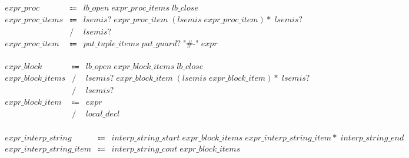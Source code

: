 \begin{align*}
    \begin{array}{rcll}
        \mathit{expr\_proc}
        &\Coloneq &\mathit{lb\_open}\; \mathit{expr\_proc\_items}\; \mathit{lb\_close} \\
        \mathit{expr\_proc\_items}
        &\Coloneq &\mathit{lsemis}{?}\; \mathit{expr\_proc\_item}\; (\mathit{lsemis}\; \mathit{expr\_proc\_item}){*}\; \mathit{lsemis}{?} \\
        &\mathrel{/} &\mathit{lsemis}{?} \\
        \mathit{expr\_proc\_item}
        &\Coloneq &\mathit{pat\_tuple\_items}\; \mathit{pat\_guard}{?}\; \texttt{"\#-"}\; \mathit{expr}
    \end{array}
\end{align*}

\begin{align*}
    \begin{array}{rcll}
        \mathit{expr\_block}
        &\Coloneq &\mathit{lb\_open}\; \mathit{expr\_block\_items}\; \mathit{lb\_close} \\
        \mathit{expr\_block\_items}
        &\mathrel{/} &\mathit{lsemis}{?}\; \mathit{expr\_block\_item}\; (\mathit{lsemis}\; \mathit{expr\_block\_item}){*}\; \mathit{lsemis}{?} \\
        &\mathrel{/} &\mathit{lsemis}{?} \\
        \mathit{expr\_block\_item}
        &\Coloneq &\mathit{expr} \\
        &\mathrel{/} &\mathit{local\_decl}
    \end{array}
\end{align*}

\begin{align*}
    \begin{array}{rcll}
        \mathit{expr\_interp\_string}
        &\Coloneq &\mathit{interp\_string\_start}\; \mathit{expr\_block\_items}\; \mathit{expr\_interp\_string\_item}{*}\; \mathit{interp\_string\_end} \\
        \mathit{expr\_interp\_string\_item}
        &\Coloneq &\mathit{interp\_string\_cont}\; \mathit{expr\_block\_items}
    \end{array}
\end{align*}

